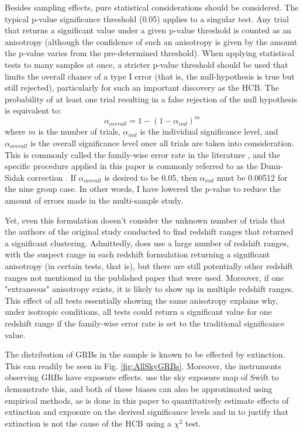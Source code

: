 \documentclass[fleqn,usenatbib]{mnras}
\begin{document}
Besides sampling effects, pure statistical considerations should be considered. The typical p-value significance threshold (0.05) applies to a singular test. Any trial that returns a significant value under a given p-value threshold is counted as an anisotropy (although the confidence of such an anisotropy is given by the amount the p-value varies from the pre-determined threshold). When applying statistical tests to many samples at once, a stricter p-value threshold should be used that limits the overall chance of a type I error (that is, the null-hypothesis is true but still rejected), particularly for such an important discovery as the HCB. The probability of at least one trial resulting in a false rejection of the null hypothesis is equivalent to:
\begin{equation}
    \alpha_{overall}=1-(1-\alpha_{ind})^{m}
    \label{eq:familywise}
\end{equation}
where $m$ is the number of trials, $\alpha_{ind}$ is the individual significance level, and $\alpha_{overall}$ is the overall significance level once all trials are taken into consideration. This is commonly called the family-wise error rate in the literature \citep{Feise2002}, and the specific procedure applied in this paper is commonly referred to as the Dunn-Sidak correction \citep{robertsokal1994}. If $\alpha_{overall}$ is desired to be 0.05, then $\alpha_{ind}$ must be 0.00512 for the nine group case. In other words, I have lowered the p-value to reduce the amount of errors made in the multi-sample study.

Yet, even this formulation doesn't consider the unknown number of trials that the authors of the original study conducted to find redshift ranges that returned a significant clustering. Admittedly, \citet{horvath2015} does use a large number of redshift ranges, with the suspect range in each redshift formulation returning a significant anisotropy (in certain tests, that is), but there are still potentially other redshift ranges not mentioned in the published paper that were used. Moreover, if one "extraneous" anisotropy exists, it is likely to show up in multiple redshift ranges. This effect of all tests essentially showing the same anisotropy explains why, under isotropic conditions, all tests could return a significant value for one redshift range if the family-wise error rate is set to the traditional significance value.

The distribution of GRBs in the sample is known to be effected by extinction. This can readily be seen in Fig. \ref{fig:AllSkyGRBs}. Moreover, the instruments observing GRBs have exposure effects. \citet{horvath2015} use the sky exposure map of Swift to demonstrate this, and both of these biases can also be approximated using empirical methods, as is done in this paper to quantitatively estimate effects of extinction and exposure on the derived significance levels and in \citet{horvath2015} to justify that extinction is not the cause of the HCB using a $\chi^2$ test.
\end{document}
